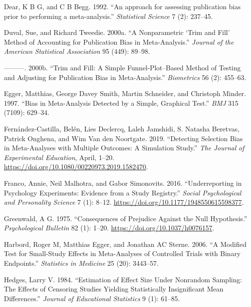 \documentclass[
]{article}
\newlength{\cslhangindent}
\newenvironment{CSLReferences}[2] %
 {\begin{list}{}{%
  \setlength{\itemindent}{0pt}
  \setlength{\leftmargin}{0pt}
  \setlength{\parsep}{0pt}
  \ifodd #1
   \setlength{\leftmargin}{\cslhangindent}
   \setlength{\itemindent}{-1\cslhangindent}
  \fi
  \setlength{\itemsep}{#2\baselineskip}}}
 {\end{list}}
\begin{document}
\begin{CSLReferences}{1}{0}
Dear, K B G, and C B Begg. 1992. {``{An approach for assessing
publication bias prior to performing a meta-analysis}.''}
\emph{Statistical Science} 7 (2): 237--45.

Duval, Sue, and Richard Tweedie. 2000a. {``A Nonparametric {`Trim and
Fill'} Method of Accounting for Publication Bias in Meta-Analysis.''}
\emph{Journal of the American Statistical Association} 95 (449): 89--98.

---------. 2000b. {``Trim and Fill: A Simple Funnel-Plot--Based Method
of Testing and Adjusting for Publication Bias in Meta-Analysis.''}
\emph{Biometrics} 56 (2): 455--63.

Egger, Matthias, George Davey Smith, Martin Schneider, and Christoph
Minder. 1997. {``Bias in Meta-Analysis Detected by a Simple, Graphical
Test.''} \emph{BMJ} 315 (7109): 629--34.

Fernández-Castilla, Belén, Lies Declercq, Laleh Jamshidi, S. Natasha
Beretvas, Patrick Onghena, and Wim Van den Noortgate. 2019. {``Detecting
Selection Bias in Meta-Analyses with Multiple Outcomes: A Simulation
Study.''} \emph{The Journal of Experimental Education}, April, 1--20.
\url{https://doi.org/10.1080/00220973.2019.1582470}.

Franco, Annie, Neil Malhotra, and Gabor Simonovits. 2016.
{``Underreporting in Psychology Experiments: Evidence from a Study
Registry.''} \emph{Social Psychological and Personality Science} 7 (1):
8--12. \url{https://doi.org/10.1177/1948550615598377}.

Greenwald, A G. 1975. {``Consequences of Prejudice Against the Null
Hypothesis.''} \emph{Psychological Bulletin} 82 (1): 1--20.
\url{https://doi.org/10.1037/h0076157}.

Harbord, Roger M, Matthias Egger, and Jonathan AC Sterne. 2006. {``A
Modified Test for Small-Study Effects in Meta-Analyses of Controlled
Trials with Binary Endpoints.''} \emph{Statistics in Medicine} 25 (20):
3443--57.

Hedges, Larry V. 1984. {``Estimation of Effect Size Under Nonrandom
Sampling: The Effects of Censoring Studies Yielding Statistically
Insignificant Mean Differences.''} \emph{Journal of Educational
Statistics} 9 (1): 61--85.


\end{CSLReferences}
\end{document}

